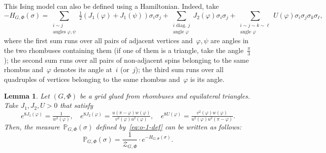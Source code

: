 \documentclass[reqno,11pt,a4paper]{amsart}
\newtheorem{lemma}[proposition]{Lemma}
\theoremstyle{remark}
\newcommand{\bbP}{\mathbb{P}}
\def\cZ{\mathcal Z}
\begin{document}
This Ising model can also be defined using a Hamiltonian. Indeed, take
	\[
		- H_{G,\Phi}(\sigma) =
		\sum_{\substack{i\sim j \\ \text{angles } \varphi, \psi }} \tfrac12 (J_{1}(\varphi) + J_{1}(\psi))\sigma_{i}\sigma_{j} +
		\sum_{\substack{i \text{ diag. }  j \\  \text{angle } \varphi }} J_{2}(\varphi) \sigma_{i}\sigma_{j} +
		\sum_{\substack{i\sim j\sim k\sim \ell \\  \text{angle } \varphi }} U(\varphi) \sigma_{i}\sigma_{j}\sigma_{k}\sigma_{\ell},
	\]
	where the first sum runs over all pairs of adjacent vertices and~$\varphi,\psi$ are angles in the two rhombuses containing them (if one of them is a triangle, take the angle~$\tfrac{\pi}{3}$); 
the second sum runs over all pairs of non-adjacent spins belonging to the same rhombus and~$\varphi$ denotes its angle at~$i$ (or~$j$);
the third sum runs over all quadruples of vertices belonging to the same rhombus and~$\varphi$ is its angle.

\begin{lemma}
	Let $(G, \Phi)$ be a grid glued from rhombuses and equilateral triangles.
	Take $J_1,J_2,U>0$ that satisfy
	\begin{equation}
		\label{eq:hamiltonian-coefficients}
		e^{8J_1(\varphi)} = \tfrac{1}{w^{2} (\varphi)}, \quad
		e^{8J_2(\varphi)} = \tfrac{u (\pi-\varphi)w (\varphi)}{v^2 (\varphi)u^2 (\varphi)},   \quad
		e^{8U(\varphi)}=\tfrac{v^2 (\varphi)w (\varphi)}{u^2 (\varphi)u^2(\pi-\varphi)}.
	\end{equation}
	Then, the measure~$\bbP_{G,\Phi}(\sigma)$ defined by~\eqref{eq:o-1-def} can be written as follows:
	\begin{equation}\label{eq:def-via-hamiltonian}
		\bbP_{G,\Phi}(\sigma) = \frac{1}{\cZ_{G,\Phi}}\cdot e^{-H_{G,\Phi}(\sigma)}.
	\end{equation}
\end{lemma}
\end{document}
